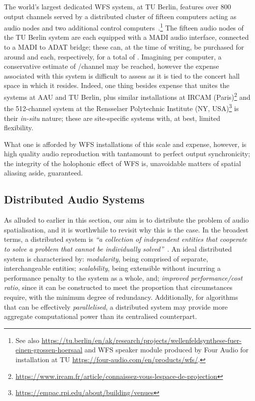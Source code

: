 \documentclass[utf8]{FrontiersinHarvard}
\begin{document}
    The world's largest dedicated WFS system, at TU Berlin, features over 800
    output channels served by a distributed cluster of fifteen computers acting
    as audio nodes and two additional control
    computers~\citep{baalman_renewed_2007}.\footnote{
        See also
        \url{https://tu.berlin/en/ak/research/projects/wellenfeldsynthese-fuer-einen-grossen-hoersaal}
        and WFS speaker module produced by Four Audio for installation at TU
        \url{https://four-audio.com/en/products/wfs/}.
    }
    The fifteen audio nodes of the TU Berlin system are each equipped with a MADI
    audio interface, connected to a MADI to ADAT bridge;
    these can, at the time of writing, be purchased for around
     and  each, respectively, for a
    total of .
    Imagining  per computer, a conservative estimate of
    /channel may be reached, however the expense associated with
    this  system is difficult to assess as it is tied to the concert hall space
    in which it resides.
    Indeed, one thing besides expense that unites the systems at AAU and TU
    Berlin, plus similar installations at IRCAM (Paris)\footnote{
        \url{https://www.ircam.fr/article/connaissez-vous-lespace-de-projection}
    }
    and the 512-channel system at the Rensselaer Polytechnic Institute
    (NY, USA)\footnote{
        \url{https://empac.rpi.edu/about/building/venues}
    } is their \textit{in-situ} nature;
    these are site-specific systems with, at best, limited flexibility.

    What one is afforded by WFS installations of this scale and expense, however, is
    high quality audio reproduction with tantamount to perfect output synchronicity;
    the integrity of the holophonic effect of WFS is, unavoidable matters of spatial
    aliasing aside, guaranteed.

    \subsection{Distributed Audio Systems}\label{subsec:distributed-audio-systems}

    As alluded to earlier in this section, our aim is to distribute the problem
    of audio spatialisation, and it is worthwhile to revisit why this is the
    case.
    In the broadest terms, a distributed system is \textit{``a collection of
    independent entities that cooperate to solve a problem that cannot be
    individually solved''}~\citep{kshemkalyani_distributed_2011}.
    An ideal distributed system is characterised by: \textit{modularity}, being
    comprised of separate, interchangeable entities; \textit{scalability}, being
    extensible without incurring a performance penalty to the system as a whole,
    and; \textit{improved performance/cost ratio}, since it can be constructed
    to meet the proportion that circumstances require, with the minimum degree
    of redundancy.
    Additionally, for algorithms that can be effectively \textit{parallelised},
    a distributed system may provide more aggregate computational power than its
    centralised counterpart.
\end{document}
